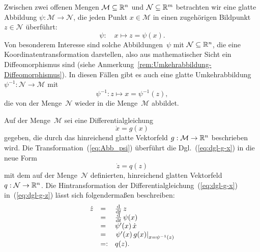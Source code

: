 Zwischen zwei offenen Mengen $\mathcal{M}\subseteq{\mathbb{R}}^{n}$ und $\mathcal{N}\subseteq{\mathbb{R}}^{m}$
betrachten wir eine glatte Abbildung $\psi:\mathcal{M}\to\mathcal{N}$,
die jeden Punkt $x\in\mathcal{M}$ in einen zugehörigen Bildpunkt
$z\in\mathcal{N}$ überführt: 
\begin{equation}
\psi:\quad x\mapsto z=\psi(x).\label{eq:Abb_psi}
\end{equation}
Von besonderem Interesse sind solche Abbildungen~$\psi$ mit $\mathcal{N}\subseteq{\mathbb{R}}^{n}$,
die eine Koordinatentransformation darstellen, also aus mathematischer
Sicht ein Diffeomorphismus sind (siehe Anmerkung~\ref{rem:Umkehrabbildung-Diffeomorphismus}).
In diesen Fällen gibt es auch eine glatte Umkehrabbildung $\psi^{-1}:\mathcal{N}\to\mathcal{M}$
mit 
\begin{equation}
\psi^{-1}:z\mapsto x=\psi^{-1}(z),\label{eq:Abb_psi_umkehr}
\end{equation}
die von der Menge~$\mathcal{N}$ wieder in die Menge~$\mathcal{M}$
abbildet.

Auf der Menge~$\mathcal{M}$ sei eine Differentialgleichung 
\begin{equation}
\dot{x}=g(x)\label{eq:dgl-g-x}
\end{equation}
gegeben, die durch das hinreichend glatte Vektorfeld $g:\mathcal{M}\to{\mathbb{R}}^{n}$
beschrieben wird. Die Transformation~(\ref{eq:Abb_psi}) überführt
die Dgl.~(\ref{eq:dgl-g-x}) in die neue Form 
\begin{equation}
\dot{z}=q(z)\label{eq:dgl-g-z}
\end{equation}
mit dem auf der Menge~$\mathcal{N}$ definierten, hinreichend glatten
Vektorfeld $q:\mathcal{N}\to{\mathbb{R}}^{n}$. Die Hintransformation der Differentialgleichung~(\ref{eq:dgl-g-x})
in~(\ref{eq:dgl-g-z}) lässt sich folgendermaßen  beschreiben:
\begin{equation}
\begin{array}{rll}
\dot{z} & = & \frac{\mathrm{d}}{\mathrm{d} t}\,z\\
 & = & \frac{\mathrm{d}}{\mathrm{d} t}\,\psi(x)\\
 & = & \psi^{\prime}(x)\,\dot{x}\\
 & = & \left.\psi^{\prime}(x)\,g(x)\right|_{x=\psi^{-1}(z)}\\
 & =: & q(z).
\end{array}\label{eq:Hintransformation-g-q}
\end{equation}

